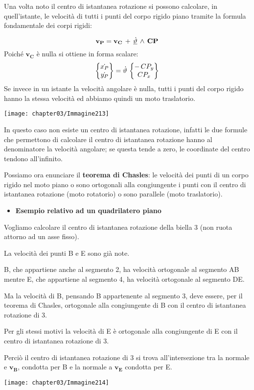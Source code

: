 Una volta noto il centro di istantanea rotazione si possono calcolare, in quell'istante, le velocità di tutti i punti del corpo rigido piano tramite la formula fondamentale dei corpi rigidi:

\begin{minipage}{.5\textwidth}
\[\mathbf{v_P}=\mathbf{v_C}\,+\,\underline{\dot{\vartheta}}\,\wedge\,\mathbf{CP}\]
Poiché $\mathbf{v_C}$ è nulla si ottiene in forma scalare:
\[\begin{Bmatrix}\dot{x_P}\\\dot{y_P}\end{Bmatrix}=\dot{\vartheta}\,\begin{Bmatrix}-\,CP_y\\CP_x\end{Bmatrix}\]
Se invece in un istante la velocità angolare è nulla, tutti i punti del corpo rigido hanno la stessa velocità ed abbiamo quindi un moto traslatorio.
\end{minipage}
\hfill
\begin{minipage}{.5\textwidth}
\centering
\texttt{[image: chapter03/Immagine213]}
\end{minipage}

In questo caso non esiste un centro di istantanea rotazione, infatti le due formule che permettono di calcolare il centro di istantanea rotazione hanno al denominatore la velocità angolare; se questa tende a zero, le coordinate del centro tendono all'infinito.

Possiamo ora enunciare il \textbf{teorema di Chasles}: le velocità dei punti di un corpo rigido nel moto piano o sono ortogonali alla congiungente i punti con il centro di istantanea rotazione (moto rotatorio) o sono parallele (moto traslatorio).

\begin{itemize}
\item \textbf{Esempio relativo ad un quadrilatero piano}
\end{itemize}

\begin{minipage}{.5\textwidth}
Vogliamo calcolare il centro di istantanea rotazione della biella 3 (non ruota attorno ad un asse fisso).

La velocità dei punti B e E sono già note.

B, che appartiene anche al segmento 2, ha velocità ortogonale al segmento AB mentre E, che appartiene al segmento 4, ha velocità ortogonale al segmento DE.

Ma la velocità di B, pensando B appartenente al segmento 3, deve essere, per il teorema di Chasles, ortogonale alla congiungente di B con il centro di istantanea rotazione di 3.

Per gli stessi motivi la velocità di E è ortogonale alla congiungente di E con il centro di istantanea rotazione di 3.

Perciò il centro di istantanea rotazione di 3 si trova all'intersezione tra la normale e $\mathbf{v_B}$, condotta per B e la normale a $\mathbf{v_E}$ condotta per E.
\end{minipage}
\hfill
\begin{minipage}{.5\textwidth}
\centering
\texttt{[image: chapter03/Immagine214]}
\end{minipage}	


